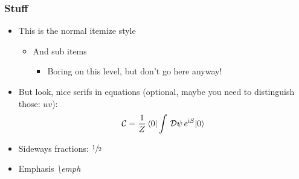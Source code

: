\documentclass[mathserif, fleqn]{beamer}
\begin{document}
\begin{frame}\frametitle{Stuff}
  \begin{itemize}
  \item This is the normal itemize style
    \begin{itemize}
    \item And sub items
      \begin{itemize}
      \item Boring on this level, but don't go here anyway!
      \end{itemize}
    \end{itemize}

  \item But look, nice serifs in equations (optional, maybe you need to distinguish those: $uv$):
    \begin{align*}
      \mathcal{C} = \frac1{Z} \braket{0|\int\,\mathcal{D}\psi\,e^{\mathrm{i} S}|0}
    \end{align*}

  \item Sideways fractions: $\sfrac{1}{2}$

  \item Emphasis    \emph{\textbackslash{}emph}
  \end{itemize}
\end{frame}
\end{document}
